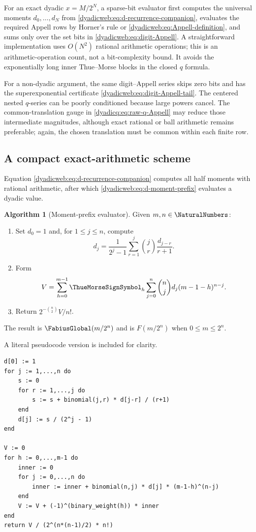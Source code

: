 \documentclass[11pt,oneside]{article}
\theoremstyle{definition}
\newtheorem{algorithm}[algorithm]{Algorithm}
\theoremstyle{remark}
\begin{document}
For an exact dyadic $x=M/2^N$, a sparse-bit evaluator first computes the universal moments
$d_0,\ldots,d_N$ from \eqref{dyadicweb:eq:d-recurrence-companion}, evaluates the required
Appell rows by Horner's rule or \eqref{dyadicweb:eq:Appell-definition}, and sums only over the
set bits in \eqref{dyadicweb:eq:digit-Appell}.  A straightforward implementation uses
$O(N^2)$ rational arithmetic operations; this is an arithmetic-operation count, not a
bit-complexity bound.  It avoids the exponentially long inner Thue--Morse blocks in the closed
$q$ formula.

For a non-dyadic argument, the same digit--Appell series skips zero bits and has the
superexponential certificate \eqref{dyadicweb:eq:digit-Appell-tail}.  The centered nested
$q$-series can be poorly conditioned because large powers cancel.  The common-translation
gauge in \eqref{dyadicq:eq:raw-q-Appell} may reduce those intermediate magnitudes, although
exact rational or ball arithmetic remains preferable; again, the chosen translation must be
common within each finite row.

\subsection{A compact exact-arithmetic scheme}

Equation \eqref{dyadicweb:eq:d-recurrence-companion} computes all half moments with rational arithmetic,
after which \eqref{dyadicweb:eq:d-moment-prefix} evaluates a dyadic value.

\begin{algorithm}[Moment-prefix evaluator]
\label{dyadicweb:alg:moment-prefix}
Given $m,n\in\NaturalNumbers$:
\begin{enumerate}
\item Set $d_0=1$ and, for $1\le j\le n$, compute
\[
 d_j=\frac1{2^j-1}\sum_{r=1}^{j}\binom jr\frac{d_{j-r}}{r+1}.
\]
\item Form
\[
 V=\sum_{h=0}^{m-1}\ThueMorseSignSymbol_h
   \sum_{j=0}^{n}\binom njd_j(m-1-h)^{n-j}.
\]
\item Return $2^{-\binom n2}V/n!$.
\end{enumerate}
The result is $\FabiusGlobal(m/2^n)$ and is $F(m/2^n)$ when $0\le m\le2^n$.
\end{algorithm}

A literal pseudocode version is included for clarity.

\begin{lstlisting}[style=pseudo,caption={Exact dyadic evaluation from half moments.}]
d[0] := 1
for j := 1,...,n do
    s := 0
    for r := 1,...,j do
        s := s + binomial(j,r) * d[j-r] / (r+1)
    end
    d[j] := s / (2^j - 1)
end

V := 0
for h := 0,...,m-1 do
    inner := 0
    for j := 0,...,n do
        inner := inner + binomial(n,j) * d[j] * (m-1-h)^(n-j)
    end
    V := V + (-1)^(binary_weight(h)) * inner
end
return V / (2^(n*(n-1)/2) * n!)
\end{lstlisting}
\end{document}
